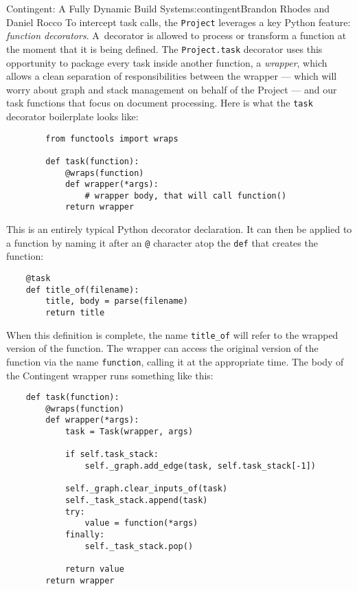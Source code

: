 \begin{aosachapter}{Contingent: A Fully Dynamic Build System}{s:contingent}{Brandon Rhodes and Daniel Rocco}
To intercept task calls, the \texttt{Project} leverages a key Python
feature: \emph{function decorators}. A~decorator is allowed to process
or transform a function at the moment that it is being defined. The
\texttt{Project.task} decorator uses this opportunity to package every
task inside another function, a \emph{wrapper}, which allows a clean
separation of responsibilities between the wrapper --- which will worry
about graph and stack management on behalf of the Project --- and our
task functions that focus on document processing. Here is what the
\texttt{task} decorator boilerplate looks like:

\begin{verbatim}
        from functools import wraps

        def task(function):
            @wraps(function)
            def wrapper(*args):
                # wrapper body, that will call function()
            return wrapper
\end{verbatim}

This is an entirely typical Python decorator declaration. It can then be
applied to a function by naming it after an \texttt{@} character atop
the \texttt{def} that creates the function:

\begin{verbatim}
    @task
    def title_of(filename):
        title, body = parse(filename)
        return title
\end{verbatim}

When this definition is complete, the name \texttt{title\_of} will refer
to the wrapped version of the function. The wrapper can access the
original version of the function via the name \texttt{function}, calling
it at the appropriate time. The body of the Contingent wrapper runs
something like this:

\begin{verbatim}
    def task(function):
        @wraps(function)
        def wrapper(*args):
            task = Task(wrapper, args)

            if self.task_stack:
                self._graph.add_edge(task, self.task_stack[-1])

            self._graph.clear_inputs_of(task)
            self._task_stack.append(task)
            try:
                value = function(*args)
            finally:
                self._task_stack.pop()

            return value
        return wrapper
\end{verbatim}


\end{aosachapter}
